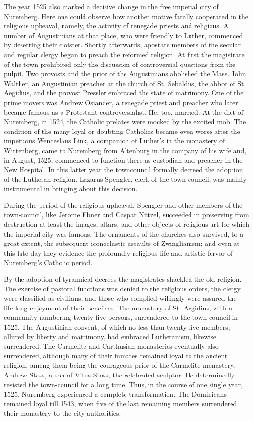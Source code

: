 The year 1525 also marked a decisive change in the free imperial
city of Nuremberg. Here one could observe how another motive fatally cooperated
in the religious upheaval, namely, the activity of
renegade priests and religious. A number of Augustinians at that
place, who were friendly to Luther, commenced by deserting their
cloister. Shortly afterwards, apostate members of the secular and
regular clergy began to preach the reformed religion. At first the
magistrate of the town prohibited only the discussion of controversial
questions from the pulpit. Two provosts and the prior of the
Augustinians abolished the Mass. John Walther, an Augustinian
preacher at the church of St. Sebaldus, the abbot of St. Aegidius, and
the provost Pressler embraced the state of matrimony. One of the
prime movers was Andrew Osiander, a renegade priest and preacher
who later became famous as a Protestant controversialist. He, too,
married. At the diet of Nuremberg, in 1524, the Catholic prelates
were mocked by the excited mob. The condition of the many loyal
or doubting Catholics became even worse after the impetuous Wenceslaus
Link, a companion of Luther’s in the monastery of Wittenberg,
came to Nuremberg from Altenburg in the company of his
wife and, in August, 1525, commenced to function there as custodian
and preacher in the New Hospital. In this latter year the towncouncil
formally decreed the adoption of the Lutheran religion. Lazarus
Spengler, clerk of the town-council, was mainly instrumental
in bringing about this decision.

During the period of the religious upheaval, Spengler and other
members of the town-council, like Jerome Ebner and Caspar Nützel,
succeeded in preserving from destruction at least the images, altars,
and other objects of religious art for which the imperial city
was famous. The ornaments of the churches also survived, to a great
extent, the subsequent iconoclastic assaults of Zwinglianism; and even
at this late day they evidence the profoundly religious life and artistic
fervor of Nuremberg’s Catholic period.

By the adoption of tyrannical decrees the magistrates shackled the
old religion. The exercise of pastoral functions was denied to the religious
orders, the clergy were classified as civilians, and those who
complied willingly were assured the life-long enjoyment of their
benefices. The monastery of St. Aegidius, with a community numbering twenty-five
persons, surrendered to the town-council in 1525.
The Augustinian convent, of which no less than twenty-five members, allured
by liberty and matrimony, had embraced Lutheranism,
likewise surrendered. The Carmelite and Carthusian monasteries
eventually also surrendered, although many of their inmates remained
loyal to the ancient religion, among them being the courageous prior
of the Carmelite monastery, Andrew Stoss, a son of Vitus Stoss, the
celebrated sculptor. He determinedly resisted the town-council for
a long time. Thus, in the course of one single year, 1525, Nuremberg
experienced a complete transformation. The Dominicans remained
loyal till 1543, when five of the last remaining members surrendered
their monastery to the city authorities.

